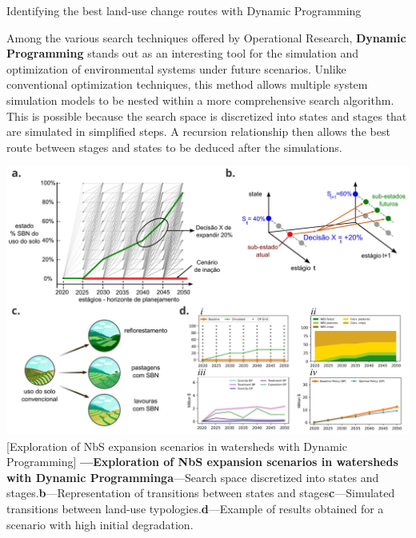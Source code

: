 \documentclass[./main_en.tex]{subfiles}
\begin{document}
\begin{simplebox}[
    float=ht!,
    label={highlight_dynamic_programming},
    nameref={Dynamic Programming}
    ]{Identifying the best land-use change routes with Dynamic Programming}
    \footnotesize
    
    \begin{minipage}[t]{\linewidth}  
    \par Among the various search techniques offered by Operational Research, \textbf{Dynamic Programming} stands out as an interesting tool for the simulation and optimization of environmental systems under future scenarios. Unlike conventional optimization techniques, this method allows multiple system simulation models to be nested within a more comprehensive search algorithm. This is possible because the search space is discretized into states and stages that are simulated in simplified steps. A recursion relationship then allows the best route between stages and states to be deduced after the simulations.   
    \end{minipage}
    
    \begin{minipage}[t]{\linewidth}
        \begin{minipage}[t]{\linewidth}
        \vspace*{5pt}
        	\includegraphics[width=\linewidth]{figs/fig_dp.jpg}	
        	[Exploration of NbS expansion scenarios in watersheds with Dynamic Programming]{
                \textbf{---\;Exploration of NbS expansion scenarios in watersheds with Dynamic Programming}\;\textbf{a}\;---\;Search space discretized into states and stages.\;\textbf{b}\;---\;Representation of transitions between states and stages\;\textbf{c}\;---\;Simulated transitions between land-use typologies.\;\textbf{d}\;---\;Example of results obtained for a scenario with high initial degradation. 
        	}
            \label{fig:dp}  %
        \vspace*{5pt}
        \end{minipage}
    \end{minipage}
    

\end{simplebox}
\end{document}
